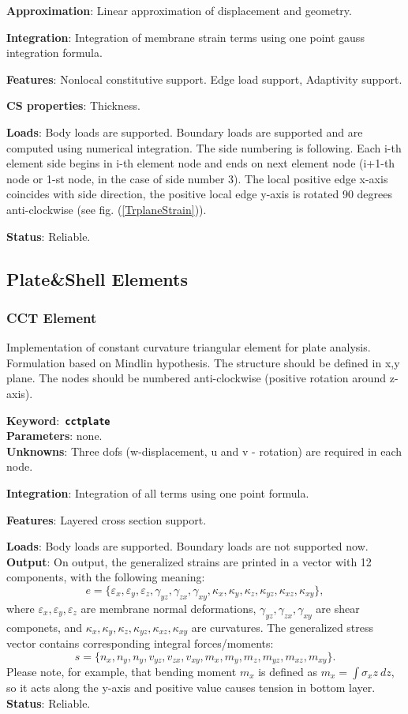 \documentclass[a4paper]{article}
\newcommand{\descitem}[1]{{\noindent \bf #1}:}
\newcommand{\elemkeyword}[1]{\descitem{Keyword}~{\bf \texttt{#1}}}
\begin{document}
\descitem{Approximation} Linear approximation of displacement and
geometry.

\descitem{Integration}
Integration of membrane strain terms using one point gauss integration formula.

\descitem{Features} Nonlocal constitutive support. Edge load
support, Adaptivity support.

\descitem{CS properties} Thickness. 

\descitem{Loads} Body loads are supported. Boundary loads are
supported and are computed  using numerical integration. The side numbering is
following. Each i-th element side begins in i-th element node and
ends on next element node (i+1-th node or 1-st node, in the case of 
side number 3). The local positive edge x-axis coincides with side
direction, the positive local edge y-axis is rotated 90 degrees
anti-clockwise (see fig. (\ref{TrplaneStrain})).

\descitem{Status} Reliable.



\subsection{Plate\&Shell Elements}
\subsubsection {CCT Element}
\label{cct}
Implementation of constant curvature triangular element for plate
analysis. Formulation based on Mindlin hypothesis. The structure should be defined in x,y plane. 
The nodes should be numbered anti-clockwise (positive rotation around
z-axis). 


\elemkeyword{cctplate}\\
\descitem{Parameters} none.\\
\descitem{Unknowns}
Three dofs (w-displacement, u and v - rotation) are required in each node.


\descitem{Integration}
Integration of all terms using one point formula.

\descitem{Features} Layered cross section support.

\descitem{Loads} Body loads are supported. Boundary loads are
not supported now.
\descitem{Output} On output, the generalized strains are printed in a vector with 12 components, with the following meaning:
$$e=\{\varepsilon_x, \varepsilon_y, \varepsilon_z, \gamma_{yz}, \gamma_{zx}, \gamma_{xy}, \kappa_x, \kappa_y, \kappa_z, \kappa_{yz}, \kappa_{xz}, \kappa_{xy}\},$$where $\varepsilon_x, \varepsilon_y, \varepsilon_z$ are membrane normal deformations, $\gamma_{yz}, \gamma_{zx}, \gamma_{xy}$ are shear componets, and $\kappa_x, \kappa_y, \kappa_z, \kappa_{yz}, \kappa_{xz}, \kappa_{xy}$ are curvatures.
The generalized stress vector contains corresponding integral forces/moments:
$$s=\{n_x, n_y, n_y, v_{yz}, v_{zx}, v_{xy}, m_x, m_y, m_z, m_{yz}, m_{xz}, m_{xy}\}.$$ Please note, for example, that bending moment $m_x$ is defined as $m_x=\int \sigma_x z\ dz$, so it acts along the y-axis and positive value causes tension in bottom layer. 
\descitem{Status} Reliable.
\end{document}
